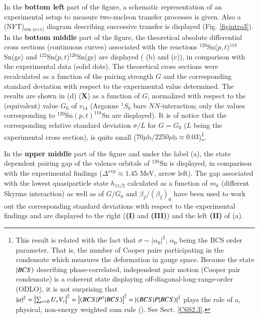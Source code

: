   In the \textbf{bottom left} part of the figure, a schematic representation of an experimental setup to measure   two-nucleon transfer processes is given. Also a (NFT)$_{\text{ren (s+r)}}$ diagram describing  successive transfer is displayed (Fig. \ref{figintro3}). In the \textbf{bottom middle} part of the figure, the theoretical absolute differential cross sections (continuous curves) associated with the reactions $^{120}$Sn($p,t$)$^{118}$Sn(gs) and $^{122}$Sn($p,t$)$^{120}$Sn(gs) are displayed ( (b) and (c)), in comparison with the experimental data (solid dots). The theoretical cross sections were recalculated as a function of the pairing strength $G$ and the corresponding standard deviation with respect to the experimental value determined. The results are shown in (d) (\textbf{X}) as a function of $G$, normalized with respect to the (equivalent) value $G_0$ of $v_{14}$ (Argonne $^1S_0$ bare $NN$-interaction; only the values corresponding to $^{120}$Sn$(p,t)^{118}$Sn are displayed). It is of notice that the corresponding relative standard deviation $\sigma/L$ for $G=G_0$  ($L$ being the experimental cross section),  is quite small ($70\mu$b/$2250\mu$b$\approx0.03$)\footnote{This result is related with the fact that $\sigma\sim|\alpha_0|^2$, $\alpha_0$ being the BCS order parameter. That is, the number of Cooper pairs participating in the condensate which measures the deformation in gauge space. Because the state $|{BCS} \rangle$ describing phase-correlated, independent pair motion (Cooper pair condensate) is a coherent state displaying off-diagonal-long-range-order (ODLO), it is not surprising that $|\alpha|^2=\left|\sum_{\nu>0}U_\nu V_\nu\right|^2=\left|\langle {BCS|P^\dagger|BCS} \rangle\right|^2=\left|\langle {BCS|P|BCS} \rangle\right|^2$ plays the role of a, physical, non-energy weighted sum rule (\cite{Potel:17}). See Sect. \ref{C6S2.3}.}.
  
  
  
  In the  \textbf{upper middle} part of the figure and under the label  (a), the state dependent pairing gap of the  valence orbitals of $^{120}$Sn is displayed, in comparison with the experimental findings ($\Delta^{exp}\approx1.45$ MeV, arrow left). The gap associated with the lowest quasiparticle state $h_{11/2}$ calculated as a function of $m_k$ (different Skyrme interaction) as well as of $G/G_0$ and $\beta_2/(\beta_2)_0$ have been used to work out the corresponding   standard deviations with respect to the experimental findings and are displayed to the right (\textbf{(I)} and \textbf{(III)}) and the left \textbf{(II)}  of (a).
  
